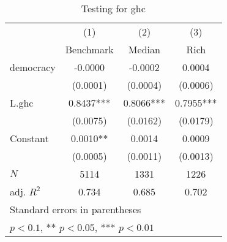 \begin{table}[htbp]\centering
\def\sym#1{\ifmmode^{#1}\else\(^{#1}\)\fi}
\caption{Testing for ghc \label{tab:regression7}}
\begin{tabular}{l*{3}{c}}
\hline\hline
            &\multicolumn{1}{c}{(1)}&\multicolumn{1}{c}{(2)}&\multicolumn{1}{c}{(3)}\\
            &\multicolumn{1}{c}{Benchmark}&\multicolumn{1}{c}{Median}&\multicolumn{1}{c}{Rich}\\
\hline
democracy   &     -0.0000   &     -0.0002   &      0.0004   \\
            &    (0.0001)   &    (0.0004)   &    (0.0006)   \\
[1em]
L.ghc       &      0.8437***&      0.8066***&      0.7955***\\
            &    (0.0075)   &    (0.0162)   &    (0.0179)   \\
[1em]
Constant    &      0.0010** &      0.0014   &      0.0009   \\
            &    (0.0005)   &    (0.0011)   &    (0.0013)   \\
\hline
\(N\)       &        5114   &        1331   &        1226   \\
adj. \(R^{2}\)&       0.734   &       0.685   &       0.702   \\
\hline\hline
\multicolumn{4}{l}{\footnotesize Standard errors in parentheses}\\
\multicolumn{4}{l}{\footnotesize * \(p<0.1\), ** \(p<0.05\), *** \(p<0.01\)}\\
\end{tabular}
\end{table}
